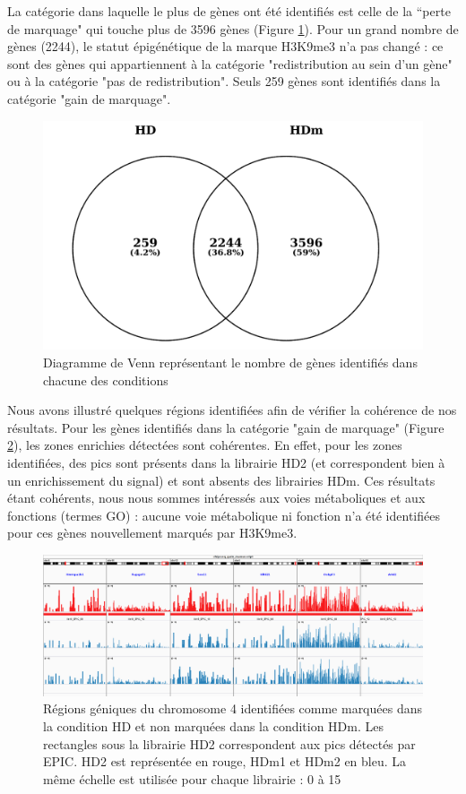 \documentclass[a4paper,12pt,times]{report}
\newcommand{\scaption}[1]{\caption{\footnotesize{#1}}}
\begin{document}
La catégorie dans laquelle le plus de gènes ont été identifiés est celle de la ``perte de marquage" qui touche plus de 3596 gènes (Figure \ref{genes}). Pour un grand nombre de gènes (2244), le statut épigénétique de la marque H3K9me3 n'a pas changé : ce sont des gènes qui appartiennent à la catégorie "redistribution au sein d'un gène" ou à la catégorie "pas de redistribution".
Seuls 259 gènes sont identifiés dans la catégorie "gain de marquage". 

\begin{figure}[!h]
\centering
\includegraphics[scale=0.2]{VennDiag_HDvsHDm_e20.png}
\scaption{Diagramme de Venn représentant le nombre de gènes identifiés dans chacune des conditions}
\label{genes}
\end{figure}

Nous avons illustré quelques régions identifiées afin de vérifier la cohérence de nos résultats.
Pour les gènes identifiés dans la catégorie "gain de marquage" (Figure \ref{gain}), les zones enrichies détectées sont cohérentes. En effet, pour les zones identifiées, des pics sont présents dans la librairie HD2 (et correspondent bien à un enrichissement du signal) et sont absents des librairies HDm. 
Ces résultats étant cohérents, nous nous sommes intéressés aux voies métaboliques et aux fonctions (termes GO) : aucune voie métabolique ni fonction n'a été identifiées pour ces gènes nouvellement marqués par H3K9me3.

\begin{figure}[!h]
\centering
\includegraphics[scale=0.28]{IGV_gain.png}
\scaption{Régions géniques du chromosome 4 identifiées comme marquées dans la condition HD et non marquées dans la condition HDm. Les rectangles sous la librairie HD2 correspondent aux pics détectés par EPIC.
HD2 est représentée en rouge, HDm1 et HDm2 en bleu. La même échelle est utilisée pour chaque librairie : 0 à 15}
\label{gain}
\end{figure}
\end{document}
